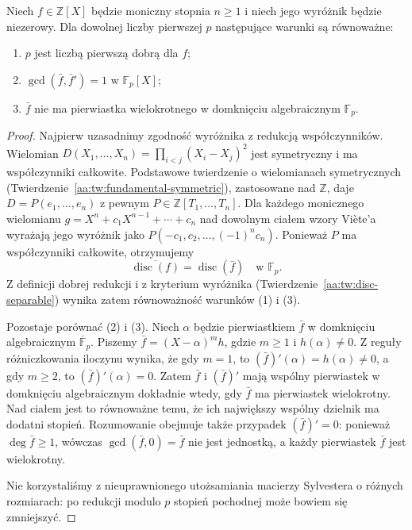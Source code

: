 \begin{lemat}\label{aa:lem:good-squarefree}
Niech $f\in\mathbb Z[X]$ będzie moniczny stopnia $n\ge1$
i niech jego wyróżnik będzie niezerowy. Dla dowolnej liczby
pierwszej $p$ następujące warunki są równoważne:
\begin{enumerate}
\item $p$ jest liczbą pierwszą dobrą dla $f$;
\item $\gcd(\bar f,\bar f')=1$ w $\mathbb F_p[X]$;
\item $\bar f$ nie ma pierwiastka wielokrotnego w domknięciu
algebraicznym $\mathbb F_p$.
\end{enumerate}
\end{lemat}
\begin{proof}
Najpierw uzasadnimy zgodność wyróżnika z redukcją współczynników.
Wielomian
$D(X_1,\ldots,X_n)=\prod_{i<j}(X_i-X_j)^2$
jest symetryczny i ma współczynniki całkowite. Podstawowe twierdzenie
o wielomianach symetrycznych
(Twierdzenie~\ref{aa:tw:fundamental-symmetric}), zastosowane nad
$\mathbb Z$, daje $D=P(e_1,\ldots,e_n)$ z pewnym
$P\in\mathbb Z[T_1,\ldots,T_n]$.
Dla każdego monicznego wielomianu
$g=X^n+c_1X^{n-1}+\cdots+c_n$ nad dowolnym ciałem wzory Viète'a
wyrażają jego wyróżnik jako
$P(-c_1,c_2,\ldots,(-1)^nc_n)$.
Ponieważ $P$ ma współczynniki całkowite, otrzymujemy
\[
 \overline{\operatorname{disc}(f)}
 =\operatorname{disc}(\bar f)\quad\text{w }\mathbb F_p.
\]
Z definicji dobrej redukcji i z kryterium wyróżnika
(Twierdzenie~\ref{aa:tw:disc-separable}) wynika zatem
równoważność warunków (1) i (3).

Pozostaje porównać (2) i (3). Niech $\alpha$ będzie pierwiastkiem
$\bar f$ w domknięciu algebraicznym $\overline{\mathbb F}_p$.
Piszemy $\bar f=(X-\alpha)^m h$, gdzie $m\ge1$ i
$h(\alpha)\ne0$. Z reguły różniczkowania iloczynu wynika,
że gdy $m=1$, to $(\bar f)'(\alpha)=h(\alpha)\ne0$,
a gdy $m\ge2$, to $(\bar f)'(\alpha)=0$.
Zatem $\bar f$ i $(\bar f)'$ mają wspólny pierwiastek
w domknięciu algebraicznym dokładnie wtedy, gdy $\bar f$
ma pierwiastek wielokrotny. Nad ciałem jest to równoważne
temu, że ich największy wspólny dzielnik ma dodatni stopień.
Rozumowanie obejmuje także przypadek $(\bar f)'=0$:
ponieważ $\deg\bar f\ge1$, wówczas
$\gcd(\bar f,0)=\bar f$ nie jest jednostką, a każdy
pierwiastek $\bar f$ jest wielokrotny.

Nie korzystaliśmy z nieuprawnionego utożsamiania
macierzy Sylvestera o różnych rozmiarach: po redukcji
modulo $p$ stopień pochodnej może bowiem się zmniejszyć.
\end{proof}

